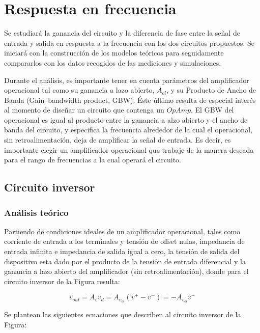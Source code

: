 \section{Respuesta en frecuencia}

Se estudiará la ganancia del circuito y la diferencia de fase entre la señal de entrada y salida en respuesta a la frecuencia con los dos circuitos propuestos. Se iniciará con la construcción de los modelos teóricos para seguidamente compararlos con los datos recogidos de las mediciones y simulaciones.  

Durante el análisis, es importante tener en cuenta parámetros del amplificador operacional tal como su ganancia a lazo abierto, $A_{ol}$, y su Producto de Ancho de Banda (Gain–bandwidth product, GBW). Éste último resulta de especial interés al momento de diseñar un circuito que contenga un $Op Amp$. El GBW del operacional es igual al producto entre la ganancia a alzo abierto y el ancho de banda del circuito, y especifica la frecuencia alrededor de la cual el operacional, sin retroalimentación, deja de amplificar la señal de entrada. Es decir, es importante elegir un amplificador operacional que trabaje de la manera deseada para el rango de frecuencias a la cual operará el circuito.  

\subsection{Circuito inversor}

\subsubsection{Análisis teórico}

Partiendo de condiciones ideales de un amplificador operacional, tales como corriente de entrada a los terminales y tensión de offset nulas,
impedancia de entrada infinita e impedancia de salida igual a cero, la tensión de salida del dispositivo esta dado por el producto de la tensión de entrada diferencial
y la ganancia a lazo abierto del amplificador (sin retroalimentación), donde para el circuito inversor de la Figura resulta:

\begin{equation} \label{eq:1}
	v_{out}=A_{v}v_{d}=A_{v_{ol}}(v^{+}-v^{-})=-A_{v_{ol}}v^{-}
\end{equation}

Se plantean las siguientes ecuaciones que describen al circuito inversor de la Figura:

